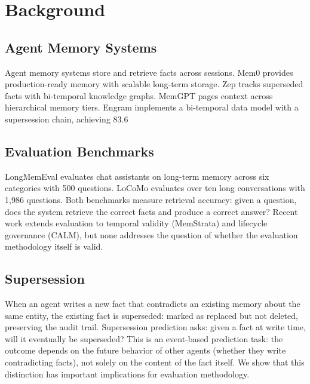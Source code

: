 \documentclass[sigconf,nonacm]{acmart}
\begin{document}
\section{Background}
\label{sec:background}

\subsection{Agent Memory Systems}
Agent memory systems store and retrieve facts across sessions. Mem0 provides production-ready memory with scalable long-term storage. Zep tracks superseded facts with bi-temporal knowledge graphs. MemGPT pages context across hierarchical memory tiers. Engram implements a bi-temporal data model with a supersession chain, achieving 83.6%

\subsection{Evaluation Benchmarks}
LongMemEval evaluates chat assistants on long-term memory across six categories with 500 questions. LoCoMo evaluates over ten long conversations with 1,986 questions. Both benchmarks measure retrieval accuracy: given a question, does the system retrieve the correct facts and produce a correct answer? Recent work extends evaluation to temporal validity (MemStrata) and lifecycle governance (CALM), but none addresses the question of whether the evaluation methodology itself is valid.

\subsection{Supersession}
When an agent writes a new fact that contradicts an existing memory about the same entity, the existing fact is superseded: marked as replaced but not deleted, preserving the audit trail. Supersession prediction asks: given a fact at write time, will it eventually be superseded? This is an event-based prediction task: the outcome depends on the future behavior of other agents (whether they write contradicting facts), not solely on the content of the fact itself. We show that this distinction has important implications for evaluation methodology.
\end{document}
